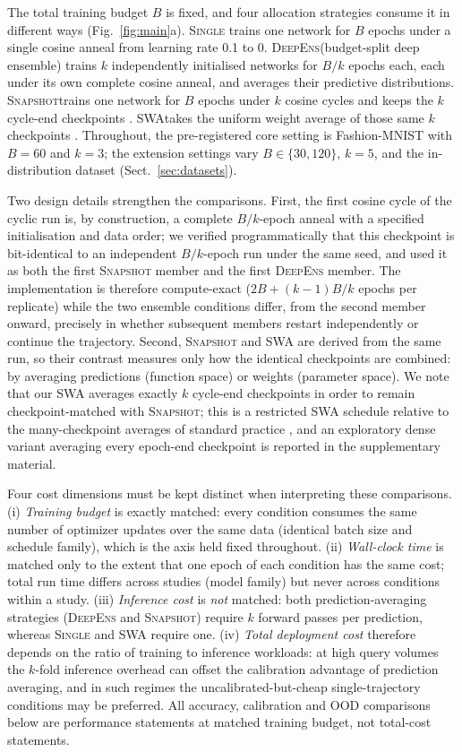 \documentclass[11pt,a4paper]{article}
\newcommand{\deepens}{\textsc{DeepEns}}
\newcommand{\snapshot}{\textsc{Snapshot}}
\newcommand{\swa}{\textsc{SWA}}
\newcommand{\single}{\textsc{Single}}
\begin{document}
The total training budget $B$ is fixed, and four allocation strategies
consume it in different ways (Fig.~\ref{fig:main}a). \single{}
trains one network for $B$ epochs under a single cosine anneal from learning
rate 0.1 to 0. \deepens (budget-split deep ensemble) trains $k$
independently initialised networks for $B/k$ epochs each, each under its own
complete cosine anneal, and averages their predictive distributions.
\snapshot trains one network for $B$ epochs under $k$ cosine
cycles \citep{loshchilov2017} and keeps the $k$ cycle-end checkpoints
\citep{huang2017}. \swa takes the uniform weight average of those
same $k$ checkpoints \citep{izmailov2018}. Throughout, the pre-registered
core setting is Fashion-MNIST with $B=60$ and $k=3$; the extension settings
vary $B \in \{30,120\}$, $k=5$, and the in-distribution dataset
(Sect.~\ref{sec:datasets}).

Two design details strengthen the comparisons. First, the first cosine
cycle of the cyclic run is, by construction, a complete $B/k$-epoch anneal
with a specified initialisation and data order; we verified
programmatically that this checkpoint is bit-identical to an independent
$B/k$-epoch run under the same seed, and used it as both the first
\snapshot{} member and the first \deepens{} member. The implementation is
therefore compute-exact ($2B + (k{-}1)B/k$ epochs per replicate) while the two
ensemble conditions differ, from the second member onward, precisely in
whether subsequent members restart independently or continue the
trajectory. Second, \snapshot{} and \swa{} are derived from the same run, so
their contrast measures only how the identical checkpoints are combined: by
averaging predictions (function space) or weights (parameter space). We
note that our \swa{} averages exactly $k$ cycle-end checkpoints in order to
remain checkpoint-matched with \snapshot{}; this is a restricted \swa{}
schedule relative to the many-checkpoint averages of standard practice
\citep{izmailov2018}, and an exploratory dense variant averaging every
epoch-end checkpoint is reported in the supplementary material.

Four cost dimensions must be kept distinct when interpreting these
comparisons. (i) \emph{Training budget} is exactly matched: every condition
consumes the same number of optimizer updates over the same data (identical
batch size and schedule family), which is the axis held fixed throughout.
(ii) \emph{Wall-clock time} is matched only to the extent that one epoch of
each condition has the same cost; total run time differs across studies
(model family) but never across conditions within a study. (iii)
\emph{Inference cost} is \emph{not} matched: both prediction-averaging
strategies (\deepens{} and \snapshot{}) require $k$ forward passes per
prediction, whereas \single{} and \swa{} require one. (iv) \emph{Total
deployment cost} therefore depends on the ratio of training to inference
workloads: at high query volumes the $k$-fold inference overhead can offset
the calibration advantage of prediction averaging, and in such regimes the
uncalibrated-but-cheap single-trajectory conditions may be preferred. All
accuracy, calibration and OOD comparisons below are performance statements
at matched training budget, not total-cost statements.
\end{document}
